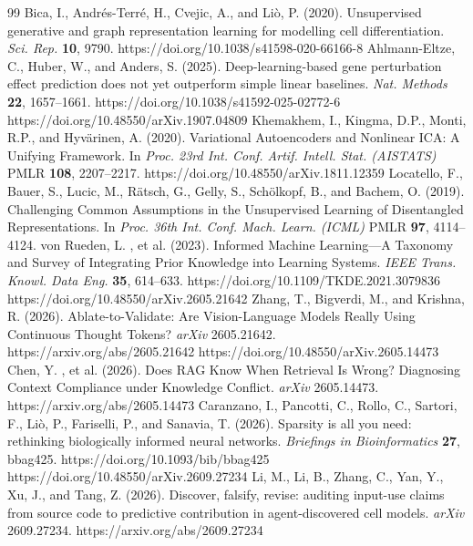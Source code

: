 \documentclass[11pt,a4paper]{article}
\begin{document}
\begin{thebibliography}{99}
 Bica, I., Andr\'{e}s-Terr\'{e}, H., Cvejic, A., and Li\`{o}, P. (2020). Unsupervised generative and graph representation learning for modelling cell differentiation. \textit{Sci. Rep.} \textbf{10}, 9790. https://doi.org/10.1038/s41598-020-66166-8
 Ahlmann-Eltze, C., Huber, W., and Anders, S. (2025). Deep-learning-based gene perturbation effect prediction does not yet outperform simple linear baselines. \textit{Nat. Methods} \textbf{22}, 1657--1661. https://doi.org/10.1038/s41592-025-02772-6
 https://doi.org/10.48550/arXiv.1907.04809 Khemakhem, I., Kingma, D.P., Monti, R.P., and Hyv\"{a}rinen, A. (2020). Variational Autoencoders and Nonlinear ICA: A Unifying Framework. In \textit{Proc. 23rd Int. Conf. Artif. Intell. Stat. (AISTATS)} PMLR \textbf{108}, 2207--2217.
 https://doi.org/10.48550/arXiv.1811.12359 Locatello, F., Bauer, S., Lucic, M., R\"{a}tsch, G., Gelly, S., Sch\"{o}lkopf, B., and Bachem, O. (2019). Challenging Common Assumptions in the Unsupervised Learning of Disentangled Representations. In \textit{Proc. 36th Int. Conf. Mach. Learn. (ICML)} PMLR \textbf{97}, 4114--4124.
 von Rueden, L. , et al. (2023). Informed Machine Learning---A Taxonomy and Survey of Integrating Prior Knowledge into Learning Systems. \textit{IEEE Trans. Knowl. Data Eng.} \textbf{35}, 614--633. https://doi.org/10.1109/TKDE.2021.3079836
 https://doi.org/10.48550/arXiv.2605.21642 Zhang, T., Bigverdi, M., and Krishna, R. (2026). Ablate-to-Validate: Are Vision-Language Models Really Using Continuous Thought Tokens? \textit{arXiv} 2605.21642. https://arxiv.org/abs/2605.21642
 https://doi.org/10.48550/arXiv.2605.14473 Chen, Y. , et al. (2026). Does RAG Know When Retrieval Is Wrong? Diagnosing Context Compliance under Knowledge Conflict. \textit{arXiv} 2605.14473. https://arxiv.org/abs/2605.14473
 Caranzano, I., Pancotti, C., Rollo, C., Sartori, F., Li\`o, P., Fariselli, P., and Sanavia, T. (2026). Sparsity is all you need: rethinking biologically informed neural networks. \textit{Briefings in Bioinformatics} \textbf{27}, bbag425. https://doi.org/10.1093/bib/bbag425
 https://doi.org/10.48550/arXiv.2609.27234 Li, M., Li, B., Zhang, C., Yan, Y., Xu, J., and Tang, Z. (2026). Discover, falsify, revise: auditing input-use claims from source code to predictive contribution in agent-discovered cell models. \textit{arXiv} 2609.27234. https://arxiv.org/abs/2609.27234


\end{thebibliography}
\end{document}
